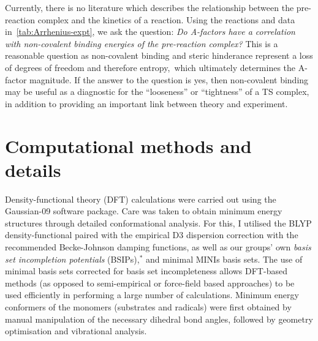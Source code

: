 Currently, there is no literature which describes the relationship between the pre-reaction complex and the kinetics of a reaction. Using the reactions and data in~\ref{tab:Arrhenius-expt}, we ask the question: \emph{Do A-factors have a correlation with non-covalent binding energies of the pre-reaction complex?} This is a reasonable question as non-covalent binding and steric hinderance represent a loss of degrees of freedom and therefore entropy,\footnotemark~which ultimately determines the A-factor magnitude. If the answer to the question is yes, then non-covalent binding may be useful as a diagnostic for the ``looseness'' or ``tightness'' of a TS complex, in addition to providing an important link between theory and experiment.


\section{Computational methods and details}

Density-functional theory (DFT) calculations were carried out using the Gaussian-09 software package.\cite{Frisch2009} Care was taken to obtain minimum energy structures through detailed conformational analysis. For this, I utilised the BLYP density-functional\cite{Becke1988,Lee1988} paired with the empirical D3 dispersion correction\cite{Grimme2010} with the recommended Becke-Johnson damping functions,\cite{Johnson2006} as well as our groups' own \emph{basis set incompletion potentials} (BSIPs),$^*$ and minimal MINIs basis sets.\cite{Huzinaga1984} The use of minimal basis sets corrected for basis set incompleteness allows DFT-based methods (as opposed to semi-empirical or force-field based approaches) to be used efficiently in performing a large number of calculations. Minimum energy conformers of the monomers (substrates and radicals) were first obtained by manual manipulation of the necessary dihedral bond angles, followed by geometry optimisation and vibrational analysis.

